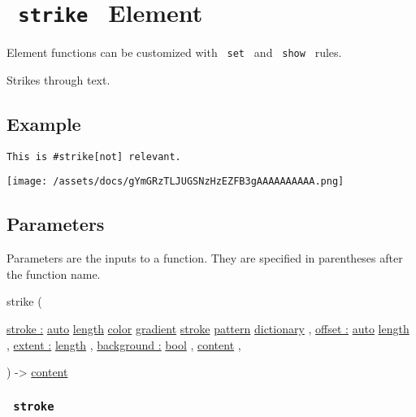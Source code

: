 \section{\texorpdfstring{\texttt{\ strike\ } {{ Element
}}}{ strike   Element }}\label{summary}

\label{element-tooltip}
Element functions can be customized with \texttt{\ set\ } and
\texttt{\ show\ } rules.

Strikes through text.

\subsection{Example}\label{example}

\begin{verbatim}
This is #strike[not] relevant.
\end{verbatim}

\texttt{[image: /assets/docs/gYmGRzTLJUGSNzHzEZFB3gAAAAAAAAAA.png]}

\subsection{\texorpdfstring{{ Parameters
}}{ Parameters }}\label{parameters}

\label{parameters-tooltip}
Parameters are the inputs to a function. They are specified in
parentheses after the function name.

{ strike } (

{ \hyperref[parameters-stroke]{stroke :}
\href{/docs/reference/foundations/auto/}{auto}
\href{/docs/reference/layout/length/}{length}
\href{/docs/reference/visualize/color/}{color}
\href{/docs/reference/visualize/gradient/}{gradient}
\href{/docs/reference/visualize/stroke/}{stroke}
\href{/docs/reference/visualize/pattern/}{pattern}
\href{/docs/reference/foundations/dictionary/}{dictionary} , } {
\hyperref[parameters-offset]{offset :}
\href{/docs/reference/foundations/auto/}{auto}
\href{/docs/reference/layout/length/}{length} , } {
\hyperref[parameters-extent]{extent :}
\href{/docs/reference/layout/length/}{length} , } {
\hyperref[parameters-background]{background :}
\href{/docs/reference/foundations/bool/}{bool} , } {
\href{/docs/reference/foundations/content/}{content} , }

) -\textgreater{} \href{/docs/reference/foundations/content/}{content}

\subsubsection{\texorpdfstring{\texttt{\ stroke\ }}{ stroke }}\label{parameters-stroke}

